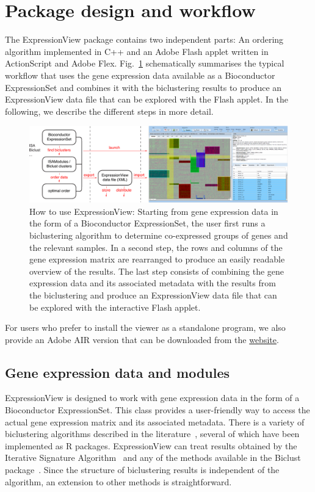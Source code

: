 \documentclass[round]{bioinfo}
\begin{document}
\section{Package design and workflow}
The ExpressionView package contains two independent parts: An ordering
algorithm implemented in C++ and an Adobe Flash applet written in
ActionScript and Adobe Flex. Fig.~\ref{fig:workflow} schematically
summarises the typical workflow that uses the gene expression data
available as a Bioconductor ExpressionSet and combines it with the
biclustering results to produce an ExpressionView data file that can
be explored with the Flash applet. In the following, we describe the
different steps in more detail. 
\begin{figure}[!tpb]
\centerline{\includegraphics[width=0.7\linewidth]{fig1-crop}}
\caption{How to use ExpressionView: Starting from gene expression data
  in the form of a Bioconductor ExpressionSet, the user first runs a
  biclustering algorithm to determine co-expressed groups of genes and
  the relevant samples. In a second step, the rows and columns of the gene
  expression matrix are rearranged to produce an easily readable
  overview of the results. The last step consists of combining the
  gene expression data and its associated metadata with the results
  from the biclustering and produce an ExpressionView data file that
  can be explored with the interactive Flash
  applet.}\label{fig:workflow} 
\end{figure}
For users who prefer to install the viewer as a standalone program, we
also provide an Adobe AIR version that can be downloaded from the
\href{http://www.unil.ch/cbg/ExpressionView}{website}. 


\subsection{Gene expression data and modules}
ExpressionView is designed to work with gene expression data in the
form of a Bioconductor ExpressionSet. This class provides a
user-friendly way to access the actual gene expression matrix and its
associated metadata. There is a variety of biclustering algorithms
described in the literature~\citep{madeira04,prelic06}, several of
which have been implemented as R packages. ExpressionView can treat
results obtained by the Iterative Signature
Algorithm~\citep{bergmann03,csardi09} and any of the methods available
in the Biclust package~\citep{kaiser08}. Since the structure of
biclustering results is independent of the algorithm, an extension to
other methods is straightforward. 
\end{document}
